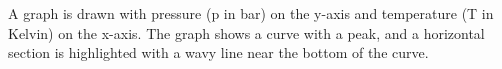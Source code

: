 A graph is drawn with pressure (p in bar) on the y-axis and temperature (T in Kelvin) on the x-axis. The graph shows a curve with a peak, and a horizontal section is highlighted with a wavy line near the bottom of the curve.